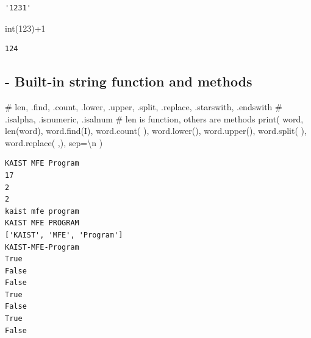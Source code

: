 \documentclass[
  letterpaper,
  DIV=11,
  numbers=noendperiod]{scrreprt}
\newenvironment{Shaded}{\begin{snugshade}}{\end{snugshade}}
\newcommand{\BuiltInTok}[1]{\textcolor[rgb]{0.00,0.23,0.31}{#1}}
\newcommand{\CharTok}[1]{\textcolor[rgb]{0.13,0.47,0.30}{#1}}
\newcommand{\CommentTok}[1]{\textcolor[rgb]{0.37,0.37,0.37}{#1}}
\newcommand{\DecValTok}[1]{\textcolor[rgb]{0.68,0.00,0.00}{#1}}
\newcommand{\NormalTok}[1]{\textcolor[rgb]{0.00,0.23,0.31}{#1}}
\newcommand{\OperatorTok}[1]{\textcolor[rgb]{0.37,0.37,0.37}{#1}}
\newcommand{\StringTok}[1]{\textcolor[rgb]{0.13,0.47,0.30}{#1}}
\begin{document}
\begin{verbatim}
'1231'
\end{verbatim}

\begin{Shaded}
\begin{Highlighting}[]
\BuiltInTok{int}\NormalTok{(}\StringTok{\textquotesingle{}123\textquotesingle{}}\NormalTok{)}\OperatorTok{+}\DecValTok{1}
\end{Highlighting}
\end{Shaded}

\begin{verbatim}
124
\end{verbatim}

\subsection{- Built-in string function and
methods}\label{built-in-string-function-and-methods}

\begin{Shaded}
\begin{Highlighting}[]
\CommentTok{\# len, .find, .count, .lower, .upper, .split, .replace, .starswith, .endswith}
\CommentTok{\# .isalpha, .isnumeric, .isalnum}
\CommentTok{\# len is function, others are methods}
\BuiltInTok{print}\NormalTok{(}
\NormalTok{    word,}
    \BuiltInTok{len}\NormalTok{(word),}
\NormalTok{    word.find(}\StringTok{\textquotesingle{}I\textquotesingle{}}\NormalTok{),}
\NormalTok{    word.count(}\StringTok{\textquotesingle{} \textquotesingle{}}\NormalTok{),}
\NormalTok{    word.lower(),}
\NormalTok{    word.upper(),}
\NormalTok{    word.split(}\StringTok{\textquotesingle{} \textquotesingle{}}\NormalTok{),}
\NormalTok{    word.replace(}\StringTok{\textquotesingle{} \textquotesingle{}}\NormalTok{,}\StringTok{\textquotesingle{}{-}\textquotesingle{}}\NormalTok{),}
\NormalTok{    sep}\OperatorTok{=}\StringTok{\textquotesingle{}}\CharTok{\textbackslash{}n}\StringTok{\textquotesingle{}}
\NormalTok{)}
\end{Highlighting}
\end{Shaded}

\begin{verbatim}
KAIST MFE Program
17
2
2
kaist mfe program
KAIST MFE PROGRAM
['KAIST', 'MFE', 'Program']
KAIST-MFE-Program
True
False
False
True
False
True
False
\end{verbatim}
\end{document}
